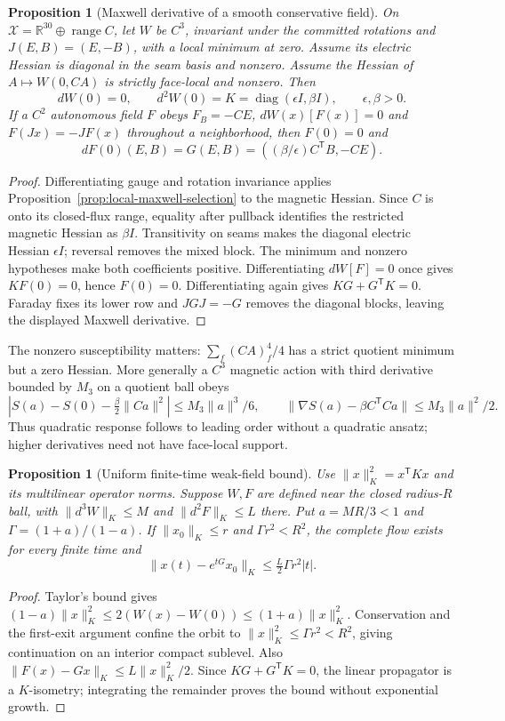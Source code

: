 \documentclass[11pt]{article}
\newtheorem{proposition}[theorem]{Proposition}
\theoremstyle{remark}
\theoremstyle{plain}
\begin{document}
\begin{proposition}[Maxwell derivative of a smooth conservative field]
\label{prop:smooth-maxwell-derivative}
On $\mathcal X=\mathbb R^{30}\oplus\operatorname{range}C$, let $W$ be
$C^3$, invariant under the committed rotations and
$J(E,B)=(E,-B)$, with a local minimum at zero. Assume its electric Hessian
is diagonal in the seam basis and nonzero. Assume the Hessian of
$A\mapsto W(0,CA)$ is strictly face-local and nonzero. Then
\[
 dW(0)=0,\qquad d^2W(0)=K=\operatorname{diag}(\epsilon I,\beta I),
 \qquad \epsilon,\beta>0.
\]
If a $C^2$ autonomous field $F$ obeys
$F_B=-CE$, $dW(x)[F(x)]=0$ and $F(Jx)=-JF(x)$ throughout a neighborhood,
then $F(0)=0$ and
\[
 dF(0)(E,B)=G(E,B)=((\beta/\epsilon)C^{\mathsf T}B,-CE).
\]
\end{proposition}
\begin{proof}
Differentiating gauge and rotation invariance applies
Proposition~\ref{prop:local-maxwell-selection} to the magnetic Hessian.
Since $C$ is onto its closed-flux range, equality after pullback identifies
the restricted magnetic Hessian as $\beta I$. Transitivity on seams makes
the diagonal electric Hessian $\epsilon I$; reversal removes the mixed
block. The minimum and nonzero hypotheses make both coefficients positive.
Differentiating $dW[F]=0$ once gives $KF(0)=0$, hence $F(0)=0$.
Differentiating again gives $KG+G^{\mathsf T}K=0$. Faraday fixes its
lower row and $JGJ=-G$ removes the diagonal blocks, leaving the displayed
Maxwell derivative.
\end{proof}

The nonzero susceptibility matters: $\sum_f(CA)_f^4/4$ has a strict
quotient minimum but a zero Hessian. More generally a $C^3$ magnetic
action with third derivative bounded by $M_3$ on a quotient ball obeys
\[
 |S(a)-S(0)-\tfrac\beta2\|Ca\|^2|\le M_3\|a\|^3/6,
 \qquad
 \|\nabla S(a)-\beta C^{\mathsf T}Ca\|\le M_3\|a\|^2/2.
\]
Thus quadratic response follows to leading order without a quadratic
ansatz; higher derivatives need not have face-local support.

\begin{proposition}[Uniform finite-time weak-field bound]
Use $\|x\|_K^2=x^{\mathsf T}Kx$ and its multilinear operator norms.
Suppose $W,F$ are defined near the closed radius-$R$ ball, with
$\|d^3W\|_K\le M$ and $\|d^2F\|_K\le L$ there. Put
$a=MR/3<1$ and $\Gamma=(1+a)/(1-a)$. If
$\|x_0\|_K\le r$ and $\Gamma r^2<R^2$, the complete flow exists for
every finite time and
\[
 \|x(t)-e^{tG}x_0\|_K\le\tfrac L2\Gamma r^2|t|.
\]
\end{proposition}
\begin{proof}
Taylor's bound gives
$(1-a)\|x\|_K^2\le2(W(x)-W(0))\le(1+a)\|x\|_K^2$.
Conservation and the first-exit argument confine the orbit to
$\|x\|_K^2\le\Gamma r^2<R^2$, giving continuation on an interior compact
sublevel. Also $\|F(x)-Gx\|_K\le L\|x\|_K^2/2$.
Since $KG+G^{\mathsf T}K=0$, the linear propagator is a $K$-isometry;
integrating the remainder proves the bound without exponential growth.
\end{proof}
\end{document}
